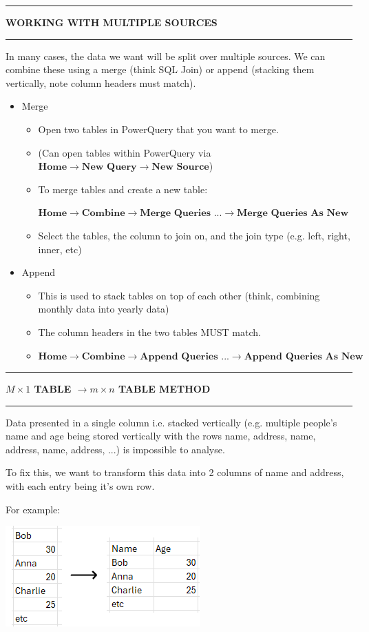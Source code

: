\documentclass[8pt]{extarticle}
\newcommand{\heading}[1]{%
    \noindent
    \rule{\linewidth}{0.4pt}
    \begin{center}
        \vspace{-1ex}
        \textbf{#1}        
        \vspace{-2.5ex}
    \end{center}
    \rule{\linewidth}{0.4pt}
}
\begin{document}
\begin{multicols}{3}
\heading{WORKING WITH MULTIPLE SOURCES}

In many cases, the data we want will be split over multiple sources. We can combine these using a merge (think SQL Join) or append (stacking them vertically, note column headers must match).

\begin{itemize}
    \item Merge
    \begin{itemize}
        \item Open two tables in PowerQuery that you want to merge.
        \item (Can open tables within PowerQuery via $\textbf{Home} \rightarrow \textbf{New Query} \rightarrow \textbf{New Source}$)
        \item To merge tables and create a new table:
        
        $\textbf{Home} \rightarrow \textbf{Combine} \rightarrow \textbf{Merge Queries ...} \rightarrow \textbf{Merge Queries As New}$
        \item Select the tables, the column to join on, and the join type (e.g. left, right, inner, etc)
    \end{itemize}
    \item Append
    \begin{itemize}
        \item This is used to stack tables on top of each other (think, combining monthly data into yearly data)
        \item The column headers in the two tables MUST match. 
        \item $\textbf{Home} \rightarrow \textbf{Combine} \rightarrow \textbf{Append Queries ...} \rightarrow \textbf{Append Queries As New}$
    \end{itemize}
\end{itemize}

\columnbreak
\heading{$M \times 1$ TABLE $\rightarrow m \times n$ TABLE METHOD}

Data presented in a single column i.e. stacked vertically (e.g. multiple people's name and age being stored vertically with the rows name, address, name, address, name, address, ...) is impossible to analyse. 

To fix this, we want to transform this data into 2 columns of name and address, with each entry being it's own row.

For example:
\begin{center}
    \includegraphics[width=0.65\columnwidth]{images/Mx1_to_mxn.png}
\end{center}


\end{multicols}
\end{document}
